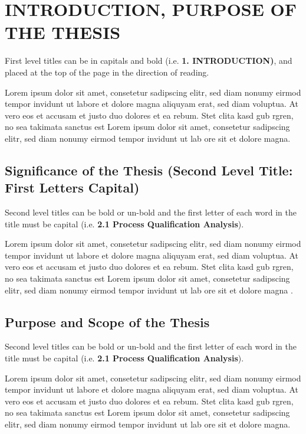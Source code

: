 \chapter{INTRODUCTION, PURPOSE OF THE THESIS}\label{Ch1}
First level titles can be in capitals and bold (i.e. \textbf{1. INTRODUCTION)}, and placed at the top of the page in the direction of reading.

Lorem ipsum dolor sit amet, consetetur sadipscing elitr, sed diam nonumy eirmod tempor invidunt ut labore et dolore magna aliquyam erat, sed diam voluptua. At vero eos et accusam et justo duo dolores et ea rebum. Stet clita kasd gub rgren, no sea takimata sanctus est  Lorem ipsum dolor sit amet, consetetur sadipscing elitr,  sed diam nonumy eirmod tempor invidunt ut lab  ore sit et dolore magna.

\section{Significance of the Thesis (Second Level Title: First Letters Capital)}\label{significanceofthesis}

Second level titles can be bold or un-bold and the first letter of each word in the title must be capital (i.e. \textbf{2.1 Process Qualification Analysis}).

Lorem ipsum dolor sit amet, consetetur sadipscing elitr, sed diam nonumy eirmod tempor invidunt ut labore et dolore magna aliquyam erat, sed diam voluptua. At vero eos et accusam et justo duo dolores et ea rebum. Stet clita kasd gub rgren, no sea takimata sanctus est Lorem ipsum dolor sit amet, consetetur sadipscing elitr, sed diam nonumy eirmod tempor invidunt ut lab ore sit et dolore magna \cite{Cutler2015, acar97, HYP:HYP57}.

\section{Purpose and Scope of the Thesis }\label{purposeofthesis}

Second level titles can be bold or un-bold and the first letter of each word in the title must be capital (i.e. \textbf{2.1 Process Qualification Analysis}).

Lorem ipsum dolor sit amet, consetetur sadipscing elitr, sed diam nonumy eirmod tempor invidunt ut labore et dolore magna aliquyam erat, sed diam voluptua. At vero eos et accusam et justo duo dolores et ea rebum. Stet clita kasd gub rgren, no sea takimata sanctus est Lorem ipsum dolor sit amet, consetetur sadipscing elitr, sed diam nonumy eirmod tempor invidunt ut lab ore sit et dolore magna.


